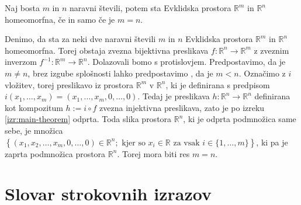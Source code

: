 \documentclass[mat1]{fmfdelo}
\newcommand{\R}{\mathbb R}
\newcommand{\0}{\underline{0}}
\begin{document}
\begin{izrek}\label{izr:dim_izr}
Naj bosta $m$ in $n$ naravni števili, potem sta Evklidska prostora $\R^m$ in $\R^n$ homeomorfna, če in samo če je $m = n$.
\end{izrek}

\begin{dokaz}
Denimo, da sta za neki dve naravni števili $m$ in $n$ Evklidska prostora $\R^m$ in $\R^n$ homeomorfna. Torej obstaja zvezna bijektivna preslikava $f : \R^n \to \R^m$ z zveznim inverzom $f^{-1} : \R^m \to \R^n$. Dolazovali bomo s protislovjem. Predpostavimo, da je $m \neq n$, brez izgube splošnosti lahko predpostavimo , da je $m < n$. Označimo z $i$ vložitev, torej preslikavo iz prostora $\R^m$ v $\R^n$, ki je definirana s predpisom $i(x_1, \dots, x_m) = (x_1, \dots, x_m, 0, \dots, 0)$. Tedaj je preslikava $h : \R^n \to \R^n$ definirana kot kompozitum $h := i \circ f$ zvezna injektivna preslikava, zato je po izreku \ref{izr:main-theorem} odprta. Toda slika prostora $\R^n$, ki je odprta podmnožica same sebe, je množica $\left \{ (x_1, x_2, \dots, x_m, 0, \dots, 0) \in \R^n ; \text{ kjer so } x_i \in \R \text{ za vsak } i \in \{1, \dots, m \}  \right \}$, ki pa je zaprta podmnožica prostora $\R^n$. Torej mora biti res $m = n$.
\end{dokaz}

\section*{Slovar strokovnih izrazov}

\geslo{}{}
\geslo{}{}
\end{document}
